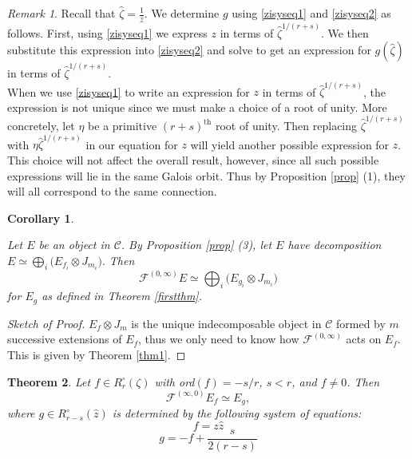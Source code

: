 \documentclass[11pt]{amsart}
\theoremstyle{theorem}
\newtheorem{theorem}{Theorem}[section]
\theoremstyle{lemma}
\theoremstyle{corollary}
\newtheorem{corollary}[theorem]{Corollary}
\theoremstyle{proposition}
\theoremstyle{definition}
\theoremstyle{remark}
\newtheorem*{remark}{Remark}
\def\d{\displaystyle}
\def\z{\hat{\zeta}}
\begin{document}
\begin{remark} Recall that $\z=\frac{1}{\hat{z}}$.
We determine $g$ using \eqref{zisyseq1} and \eqref{zisyseq2} as follows.
First, using \eqref{zisyseq1} we express $z$ in terms of $\z^{1/(r+s)}$.  We then substitute this expression
into \eqref{zisyseq2} and solve to get an expression for $g(\z)$ in terms of $\z^{1/(r+s)}$.\\

When we use \eqref{zisyseq1} to write an expression for $z$ in terms of $\z^{1/(r+s)}$, the expression is not unique since we must make a choice of a root of unity.  More concretely, let $\eta$ be a primitive $(r+s)^{\text{th}}$ root of unity.  Then replacing $\z^{1/(r+s)}$ with $\eta\z^{1/(r+s)}$ in our equation for $z$ will yield another possible expression for $z$.  This choice will not affect the overall result, however, since all such possible expressions will lie in the same Galois orbit.  Thus by Proposition \ref{prop} (1), they will all correspond to the same connection.
\end{remark}

\begin{corollary}\label{corollary}

Let $E$ be an object in $\mathcal{C}$.  By Proposition \ref{prop} (3), let $E$ have decomposition
$\d{E\simeq \bigoplus_i \bigg(E_{f_i}\otimes J_{m_i}\bigg).}$
Then
$$\mathcal{F}^{(0, \infty)}E\simeq \bigoplus_i \bigg(E_{g_i}\otimes J_{m_i}\bigg)$$for $E_g$ as defined in Theorem \ref{firstthm}.
\end{corollary}

\begin{proof}[Sketch of Proof]
  $E_f\otimes J_m$ is the unique indecomposable object in $\mathcal{C}$ formed by $m$ successive extensions of $E_f$, thus we only need to know how $\mathcal{F}^{(0, \infty)}$ acts on $E_f$.  This is given by Theorem \ref{thm1}.
\end{proof}

\begin{theorem}\label{thm2}
	 Let $f\in R^{\circ}_r(\zeta)$ with ord$(f)=-s/r$, $s<r$, and $f\neq 0$. Then
\[\mathcal{F}^{(\infty, 0)}E_{f}\simeq E_{g},\]
where $g\in R^{\circ}_{r-s}(\hat{z})$ is determined by the following system of equations:
\begin{equation}\label{izsyseq1}f=z\hat{z}
\end{equation}
\begin{equation}\label{izsyseq2} g=-f+\frac{s}{2(r-s)}
\end{equation}

\end{theorem}
\end{document}
